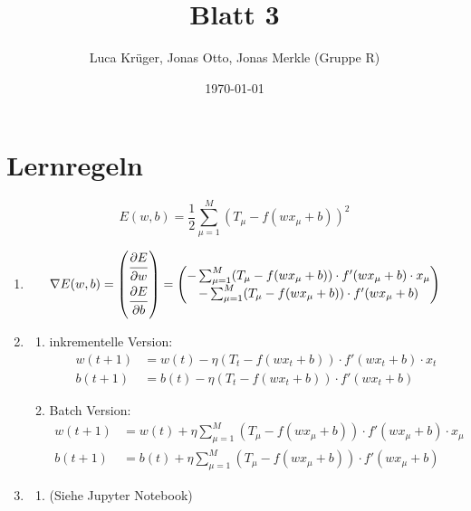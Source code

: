 \documentclass{article}
\title{Blatt 3}
\author{Luca Krüger, Jonas Otto, Jonas Merkle (Gruppe R)}
\date{\today}
\begin{document}
\maketitle

\section{Lernregeln}
$$E(w,b)=\frac{1}{2}\sum_{\mu=1}^{M}(T_{\mu}-f(wx_{\mu}+b))^2$$
\begin{enumerate}
  \item
        \begin{align*}
          \nabla E(w,b)=\begin{pmatrix} \dfrac{\strut \partial E}{\strut \partial w} \\ \dfrac{\strut \partial E}{\strut \partial b}\end{pmatrix} = \begin{pmatrix}
            - \sum_{\mu=1}^{M}(T_{\mu}-f(wx_{\mu}+b)) \cdot f'(wx_{\mu}+b)\cdot x_{\mu} \\
            - \sum_{\mu=1}^{M}(T_{\mu}-f(wx_{\mu}+b)) \cdot f'(wx_{\mu}+b)
          \end{pmatrix} \\
        \end{align*}
  \item
        \begin{enumerate}[label=\alph*)]
          \item inkrementelle Version:
                \begin{align*}
                  w(t+1) & =w(t)-\eta(T_{t}-f(wx_{t}+b)) \cdot f'(wx_{t}+b)\cdot x_t \\
                  b(t+1) & =b(t)-\eta(T_{t}-f(wx_{t}+b)) \cdot f'(wx_{t}+b)
                \end{align*}
          \item Batch Version:
                \begin{align*}
                  w(t+1) & =w(t)+\eta\sum_{\mu=1}^{M}(T_{\mu}-f(wx_{\mu}+b)) \cdot f'(wx_{\mu}+b)\cdot x_{\mu} \\
                  b(t+1) & =b(t)+\eta\sum_{\mu=1}^{M}(T_{\mu}-f(wx_{\mu}+b)) \cdot f'(wx_{\mu}+b)
                \end{align*}
        \end{enumerate}
  \item
        \begin{enumerate}[label=\alph*)]
          \item (Siehe Jupyter Notebook)

\end{enumerate}
\end{enumerate}
\end{document}
